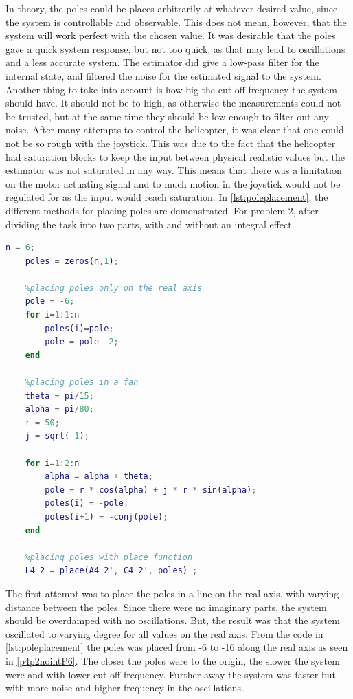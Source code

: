 \newline
\newline
In theory, the poles could be places arbitrarily at whatever desired value, since the system is controllable and observable. This does not mean, however, that the system will work perfect with the chosen value. It was desirable that the poles gave a quick system response, but not too quick, as that may lead to oscillations and a less accurate system. The estimator did give a low-pass filter for the internal state, and filtered the noise for the estimated signal to the system. Another thing to take into account is how big the cut-off frequency the system should have. It should not be to high, as otherwise the measurements could not be trusted, but at the same time they should be low enough to filter out any noise.
\newline
\newline
After many attempts to control the helicopter, it was clear that one could not be so rough with the joystick. This was due to the fact that the helicopter had saturation blocks to keep the input between physical realistic values but the estimator was not saturated in any way. This means that there was a limitation on the motor actuating signal and to much motion in the joystick would not be regulated for as the input would reach saturation. 
\newline
\newline
In \cref{lst:poleplacement}, the different methods for placing poles are demonstrated. For problem 2, after dividing the task into two parts, with and without an integral effect.

\begin{lstlisting}[caption={Matlab code showing different methods for placing poles},label={lst:poleplacement},language=Matlab]
    n = 6;
    poles = zeros(n,1);
    
    %placing poles only on the real axis
    pole = -6;
    for i=1:1:n
        poles(i)=pole;
        pole = pole -2;
    end   
    
    %placing poles in a fan
    theta = pi/15;
    alpha = pi/80;
    r = 50;
    j = sqrt(-1);
    
    for i=1:2:n
        alpha = alpha + theta;
        pole = r * cos(alpha) + j * r * sin(alpha);
        poles(i) = -pole;
        poles(i+1) = -conj(pole);
    end
    
    %placing poles with place function
    L4_2 = place(A4_2', C4_2', poles)';
\end{lstlisting}
The first attempt was to place the poles in a line on the real axis, with varying distance between the poles. Since there were no imaginary parts, the system should be overdamped with no oscillations. But, the result was that the system oscillated to varying degree for all values on the real axis. From the code in \cref{lst:poleplacement}  the poles was placed from -6 to -16 along the real axis as seen in \cref{p4p2nointP6}. The closer the poles were to the origin, the slower the system were and with lower cut-off frequency. Further away the system was faster but with more noise and higher frequency in the oscillations. 

